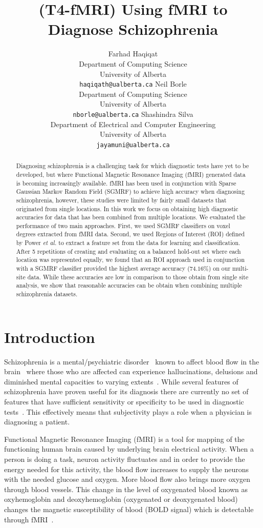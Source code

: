 \documentclass{article} %
\title{(T4-fMRI) Using fMRI to Diagnose Schizophrenia}
\author{
Farhad Haqiqat\\
Department of Computing Science\\
University of Alberta\\
\texttt{haqiqath@ualberta.ca} 
\And 
Neil Borle\\
Department of Computing Science\\
University of Alberta\\
\texttt{nborle@ualberta.ca}
\And 
Shashindra Silva\\
Department of Electrical and Computer Engineering\\
University of Alberta\\
\texttt{jayamuni@ualberta.ca}  
}
\begin{document}
	\maketitle

\begin{abstract}
Diagnosing schizophrenia is a challenging task for which diagnostic tests
have yet to be developed, but where Functional Magnetic Resonance Imaging 
(fMRI) generated data is becoming increasingly available.
fMRI has been used in conjunction with Sparse 
Gaussian Markov Random Field (SGMRF) to achieve high accuracy when diagnosing
schizophrenia, however, these studies were limited by fairly small datasets
that originated from single locations. In this work we focus on obtaining
high diagnostic accuracies for data that has been combined from multiple
locations. We evaluated the performance of two main approaches. First, we 
used SGMRF classifiers on voxel degrees extracted from fMRI data. Second, we 
used Regions of Interest (ROI) defined by Power \emph{et al.} to extract a 
feature set from the data for learning and classification. 
After 5 repetitions of creating and evaluating on a balanced hold-out set where 
each location was represented equally, we found that an ROI approach used in 
conjunction with a SGMRF classifier provided the highest average accuracy 
($74.16\%$) on our multi-site 
data. While these accuracies are low in comparison to those obtain from
single site analysis, we show that reasonable accuracies can be obtain
when combining multiple schizophrenia datasets.
\end{abstract}


\section{Introduction}
Schizophrenia is a mental/psychiatric disorder~\cite{Rish_2013, Kenji_2010} 
known to affect blood flow in the brain~\cite{Kenji_2010} where those who are 
affected can experience hallucinations, delusions and diminished mental 
capacities to varying extents~\cite{jablensky2010diagnostic}. While several
features of schizophrenia have proven useful for its diagnosis there are
currently no set of features that have sufficient sensitivity or specificity
to be used in diagnostic tests~\cite{jablensky2010diagnostic, McGuire200891}. 
This effectively means that subjectivity plays a role when a physician is 
diagnosing a patient. 

Functional Magnetic Resonance Imaging (fMRI) is a tool for mapping of the functioning human brain caused by underlying brain electrical activity\cite{fmriMatthews}. When a person is doing a 
task, neuron activity fluctuates and in order to provide the energy 
needed for this activity, the blood flow increases to supply the neurons with 
the needed glucose and oxygen\cite{fmriMatthews}. More blood flow also 
brings more oxygen through blood vessels. This change in the level of 
oxygenated blood known as oxyhemoglobin and deoxyhemoglobin (oxygenated or 
deoxygenated blood) changes the magnetic susceptibility of blood (BOLD signal) 
which is detectable through fMRI~\cite{fmriMatthews}.
\end{document}
